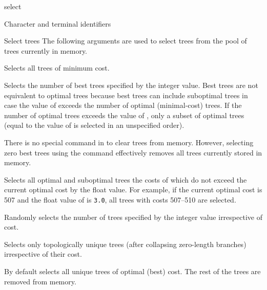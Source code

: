 \begin{command}{select}{}
\begin{arguments}
\begin{argumentgroup}{Character and terminal identifiers}
          
        \end{argumentgroup}

		\begin{argumentgroup}{Select trees}
			{The following arguments are used to select trees from the pool of trees currently in memory.}

				{Selects all trees of minimum cost.} 
                			{}
			
				{Selects the number of best trees specified by the integer value.
				Best trees are not equivalent to optimal trees because best trees
				can include suboptimal trees in case the value of
				 exceeds the number of optimal (minimal-cost)
				trees. If the number of optimal trees exceeds the value of
				, only a subset of optimal trees (equal to the
				value of  is selected in an unspecified order).} 
                			{}
	
	\begin{statement}
               There is no special command in \poy to clear trees from memory. However,
               selecting zero best trees using the command 
               effectively removes all trees currently stored in memory.
          \end{statement}
            
                {Selects all optimal and suboptimal trees the costs of which do not exceed
                the current optimal cost by the float value. For example, if the current
                optimal cost is 507 and the float value of  is
                \texttt{3.0}, all trees with costs 507--510 are selected.} 
                {}

	{Randomly selects the number of trees specified by the integer
	value irrespective of cost.} 
                {}

	{Selects only topologically unique trees (after collapsing zero-length
	branches) irrespective of their cost.} 
                {}

		\end{argumentgroup}
	
	\end{arguments}
	 	 	 	 	  
        {By default \poy selects all unique trees of optimal (best) cost. The rest of
        the trees are removed from memory.}


\end{command}
